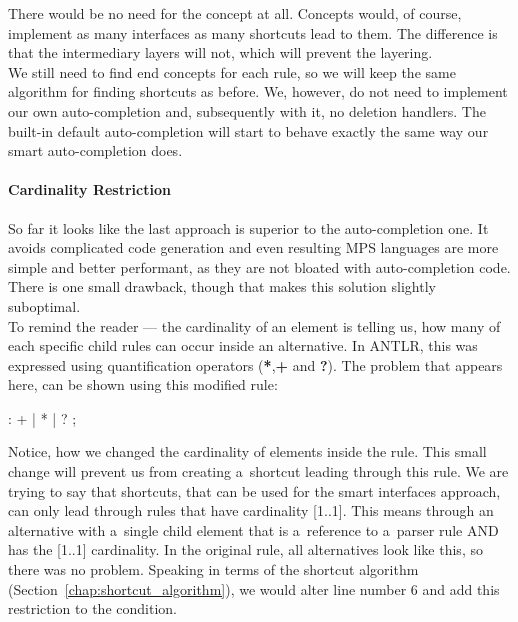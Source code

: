 There would be no need for the  concept at all.
Concepts would, of course, implement as many interfaces as many shortcuts lead to them.
The difference is that the intermediary layers will not, which will prevent the layering.
\\

We still need to find end concepts for each rule, so we will keep the same algorithm for finding shortcuts as before.
We, however, do not need to implement our own auto-completion and, subsequently with it, no deletion handlers.
The built-in default auto-completion will start to behave exactly the same way our smart auto-completion does.

\paragraph{Cardinality Restriction}
\label{chap:cardinality_restriction}

So far it looks like the last approach is superior to the auto-completion one.
It avoids complicated code generation and even resulting MPS languages are more simple and better performant, as they are not bloated with auto-completion code.
There is one small drawback, though that makes this solution slightly suboptimal.
\\

To remind the reader --- the cardinality of an element is telling us, how many of each specific child rules can occur inside an alternative.
In ANTLR, this was expressed using quantification operators (\textbf{*},\textbf{+} and \textbf{?}).
The problem that appears here, can be shown using this modified rule:

\begin{antlr}
      :   +
             |   *
             |   ?
             ;
\end{antlr}

Notice, how we changed the cardinality of elements inside the  rule.
This small change will prevent us from creating a~shortcut leading through this rule.
We are trying to say that shortcuts, that can be used for the smart interfaces approach, can only lead through rules that have cardinality [1..1].
This means through an alternative with a~single child element that is a~reference to a~parser rule AND has the [1..1] cardinality.
In the original  rule, all alternatives look like this, so there was no problem.
Speaking in terms of the shortcut algorithm (Section~\ref{chap:shortcut_algorithm}), we would alter line number 6 and add this restriction to the condition.
\\

